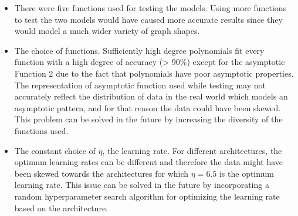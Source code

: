 \documentclass{article}
\begin{document}
\begin{itemize}
    \item There were five functions used for testing the models. Using more functions to test the two models would have caused more accurate results since they would model a much wider variety of graph shapes.
    \item The choice of functions. Sufficiently high degree polynomials fit every function with a high degree of accuracy (> 90\%) except for the asymptotic Function 2 due to the fact that polynomials have poor asymptotic properties. The representation of asymptotic function used while testing may not accurately reflect the distribution of data in the real world which models an asymptotic pattern, and for that reason the data could have been skewed. This problem can be solved in the future by increasing the diversity of the functions used.
    \item The constant choice of $\eta$, the learning rate. For different architectures, the optimum learning rates can be different and therefore the data might have been skewed towards the architectures for which $\eta=6.5$ is the optimum learning rate. This issue can be solved in the future by incorporating a random hyperparameter search algorithm for optimizing the learning rate based on the architecture.
\end{itemize}
\end{document}
